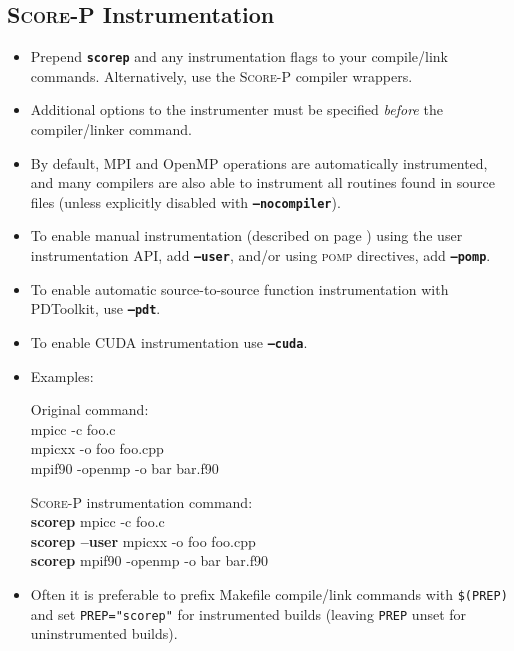 \documentclass[a4paper]{article}
\newcommand{\Scorep}{\textsc{Score-P}\xspace}
\begin{document}
\subsection*{\Scorep Instrumentation}
\begin{itemize}
  \item Prepend \textbf{\texttt{scorep}} and any instrumentation flags to your
        compile/link commands.  Alternatively, use the \Scorep compiler wrappers.
  \item Additional options to the instrumenter must be specified
        \textit{before} the compiler/linker command.
  \item By default, MPI and OpenMP operations are automatically instrumented, and
        many compilers are also able to instrument all routines found in source files
        (unless explicitly disabled with \textbf{\texttt{--nocompiler}}).
  \item To enable manual instrumentation (described on page \pageref{sec:manual_inst})
        using the user instrumentation API, add \textbf{\texttt{--user}},
        and/or using \textsc{pomp} directives, add \textbf{\texttt{--pomp}}.
  \item To enable automatic source-to-source function instrumentation with PDToolkit, use \textbf{\texttt{--pdt}}.
  \item To enable CUDA instrumentation use \textbf{\texttt{--cuda}}.
  \item Examples: \\
    \begin{minipage}[t]{0.4\linewidth}
      Original command: \\\ttfamily
      mpicc -c foo.c \\
      mpicxx -o foo foo.cpp \\
      mpif90 -openmp -o bar bar.f90
    \end{minipage}
    \begin{minipage}[t]{0.59\linewidth}
      \Scorep instrumentation command: \\\ttfamily
      \textbf{scorep} mpicc -c foo.c \\
      \textbf{scorep --user} mpicxx -o foo foo.cpp \\
      \textbf{scorep} mpif90 -openmp -o bar bar.f90
    \end{minipage}
  \item Often it is preferable to prefix Makefile compile/link commands
        with \texttt{\$(PREP)} and set \texttt{PREP="scorep"} for
        instrumented builds (leaving \texttt{PREP} unset for uninstrumented builds).
\end{itemize}
\end{document}
